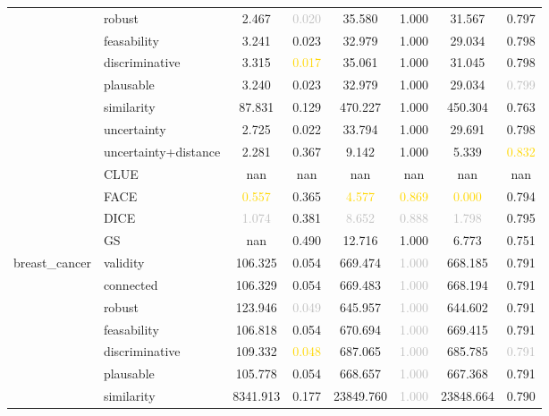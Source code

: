 \begin{table}[ht]
\begin{tabular}{l l c c c c c c}
 & robust & 2.467 & \textcolor{silver}{0.020} & 35.580 & \textcolor{bronze}{1.000} & 31.567 & 0.797 \\
 & feasability & 3.241 & 0.023 & 32.979 & \textcolor{bronze}{1.000} & 29.034 & \textcolor{bronze}{0.798} \\
 & discriminative & 3.315 & \textcolor{gold}{0.017} & 35.061 & \textcolor{bronze}{1.000} & 31.045 & 0.798 \\
 & plausable & 3.240 & 0.023 & 32.979 & \textcolor{bronze}{1.000} & 29.034 & \textcolor{silver}{0.799} \\
 & similarity & 87.831 & 0.129 & 470.227 & \textcolor{bronze}{1.000} & 450.304 & 0.763 \\
 & uncertainty & 2.725 & \textcolor{bronze}{0.022} & 33.794 & \textcolor{bronze}{1.000} & 29.691 & 0.798 \\
 & uncertainty+distance & \textcolor{bronze}{2.281} & 0.367 & \textcolor{bronze}{9.142} & \textcolor{bronze}{1.000} & \textcolor{bronze}{5.339} & \textcolor{gold}{0.832} \\
 & CLUE & nan & nan & nan & nan & nan & nan \\
 & FACE & \textcolor{gold}{0.557} & 0.365 & \textcolor{gold}{4.577} & \textcolor{gold}{0.869} & \textcolor{gold}{0.000} & 0.794 \\
 & DICE & \textcolor{silver}{1.074} & 0.381 & \textcolor{silver}{8.652} & \textcolor{silver}{0.888} & \textcolor{silver}{1.798} & 0.795 \\
 & GS & nan & 0.490 & 12.716 & \textcolor{bronze}{1.000} & 6.773 & 0.751 \\
\hline
\multirow{13}{*}{breast_cancer} & validity & 106.325 & 0.054 & 669.474 & \textcolor{silver}{1.000} & 668.185 & 0.791 \\
 & connected & 106.329 & 0.054 & 669.483 & \textcolor{silver}{1.000} & 668.194 & 0.791 \\
 & robust & 123.946 & \textcolor{silver}{0.049} & 645.957 & \textcolor{silver}{1.000} & 644.602 & \textcolor{bronze}{0.791} \\
 & feasability & 106.818 & 0.054 & 670.694 & \textcolor{silver}{1.000} & 669.415 & 0.791 \\
 & discriminative & 109.332 & \textcolor{gold}{0.048} & 687.065 & \textcolor{silver}{1.000} & 685.785 & \textcolor{silver}{0.791} \\
 & plausable & 105.778 & 0.054 & 668.657 & \textcolor{silver}{1.000} & 667.368 & 0.791 \\
 & similarity & 8341.913 & 0.177 & 23849.760 & \textcolor{silver}{1.000} & 23848.664 & 0.790 \\

\end{tabular}
\end{table}
